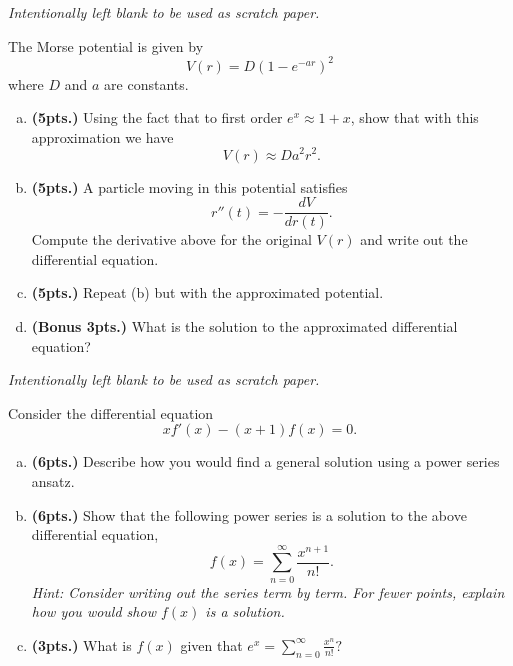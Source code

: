 \documentclass[12pt]{amsbook}
\begin{document}
\newpage
\emph{Intentionally left blank to be used as scratch paper.}\\


\newpage
\begin{problem}
The Morse potential is given by
\[
V(r)=D\left(1-e^{-ar}\right)^2
\]
where $D$ and $a$ are constants. 
\begin{enumerate}[(a)]
    \item \textbf{(5pts.)} Using the fact that to first order $e^x \approx 1+x$, show that with this approximation we have
    \[
    V(r)\approx Da^2r^2.
    \]
    \vspace*{5cm}
    \item \textbf{(5pts.)} A particle moving in this potential satisfies
    \[
    r''(t)=-\frac{dV}{dr(t)}.
    \]
    Compute the derivative above for the original $V(r)$ and write out the differential equation.
    \vspace*{4cm}
    \item \textbf{(5pts.)} Repeat (b) but with the approximated potential.
    \vspace*{4cm}
    \item \textbf{(Bonus 3pts.)} What is the solution to the approximated differential equation?
\end{enumerate}
\end{problem}

\newpage
\emph{Intentionally left blank to be used as scratch paper.}\\


\newpage
\begin{problem} 
Consider the differential equation
\[
xf'(x)-(x+1)f(x)=0.
\]
\begin{enumerate}[(a)]
    \item \textbf{(6pts.)} Describe how you would find a general solution using a power series ansatz.
    \vspace*{7cm}
    \item \textbf{(6pts.)} Show that the following power series is a solution to the above differential equation,
    \[
    f(x) = \sum_{n=0}^\infty \frac{x^{n+1}}{n!}.
    \]
    \emph{Hint: Consider writing out the series term by term. For fewer points, explain how you would show $f(x)$ is a solution.}
    \vspace*{7cm}
    \item \textbf{(3pts.)} What is $f(x)$ given that $\displaystyle{e^x=\sum_{n=0}^\infty \frac{x^n}{n!}}?$
\end{enumerate}
\end{problem}
\end{document}
